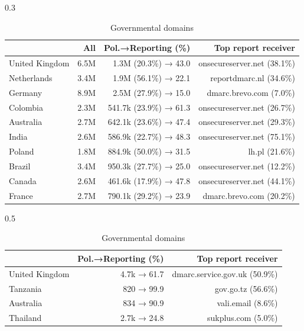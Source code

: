 \begin{table}[ht]
  \centering
  \scriptsize
  \caption{Top reporting countries and their top report receiver domain.}
  \begin{subtable}[t]{0.3\textwidth}
    \scriptsize
    \centering
    \caption{All ccTLD domains}
    \label{tab:top10_reporting_country}
    \begin{tabular}{lrrr|}
    \toprule
    & \textbf{All} & \textbf{Pol.→Reporting (\%)} & \textbf{Top report receiver} \\
    \midrule
    United Kingdom & 6.5M & 1.3M (20.3\%) → 43.0 & onsecureserver.net (38.1\%) \\
    Netherlands & 3.4M & 1.9M (56.1\%) → 22.1 & reportdmarc.nl (34.6\%) \\
    Germany & 8.9M & 2.5M (27.9\%) → 15.0 & dmarc.brevo.com (7.0\%) \\
    Colombia & 2.3M & 541.7k (23.9\%) → 61.3 & onsecureserver.net (26.7\%) \\
    Australia & 2.7M & 642.1k (23.6\%) → 47.4 & onsecureserver.net (29.3\%) \\
    India & 2.6M & 586.9k (22.7\%) → 48.3 & onsecureserver.net (75.1\%) \\
    Poland & 1.8M & 884.9k (50.0\%) → 31.5 & lh.pl (21.6\%) \\
    Brazil & 3.4M & 950.3k (27.7\%) → 25.0 & onsecureserver.net (12.2\%) \\
    Canada & 2.6M & 461.6k (17.9\%) → 47.8 & onsecureserver.net (44.1\%) \\
    France & 2.7M & 790.1k (29.2\%) → 23.9 & dmarc.brevo.com (20.2\%) \\
    \bottomrule
    \end{tabular}
  \end{subtable}
  \hfill
  \begin{subtable}[t]{0.5\textwidth}
    \scriptsize
    \centering
    \caption{Governmental domains}
    \label{tab:gov_top_reporting_countries_and_top_report_receiver}
    \begin{tabular}{lrr}
    \toprule
    & \textbf{Pol.→Reporting (\%)} & \textbf{Top report receiver} \\
    \midrule
    United Kingdom & 4.7k → 61.7  & dmarc.service.gov.uk (50.9\%) \\
    Tanzania       & 820 → 99.9   & gov.go.tz (56.6\%) \\
    Australia      & 834 → 90.9   & vali.email (8.6\%) \\
    Thailand       & 2.7k → 24.8  & sukplus.com (5.0\%) \\

\end{tabular}
\end{subtable}
\end{table}
